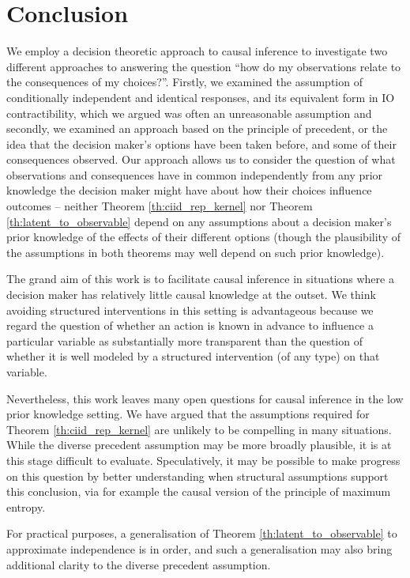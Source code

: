 \section{Conclusion}

We employ a decision theoretic approach to causal inference to investigate two different approaches to answering the question ``how do my observations relate to the consequences of my choices?''. Firstly, we examined the assumption of conditionally independent and identical responses, and its equivalent form in IO contractibility, which we argued was often an unreasonable assumption and secondly, we examined an approach based on the principle of precedent, or the idea that the decision maker's options have been taken before, and some of their consequences observed. Our approach allows us to consider the question of what observations and consequences have in common independently from any prior knowledge the decision maker might have about how their choices influence outcomes -- neither Theorem \ref{th:ciid_rep_kernel} nor Theorem \ref{th:latent_to_observable} depend on any assumptions about a decision maker's prior knowledge of the effects of their different options (though the plausibility of the assumptions in both theorems may well depend on such prior knowledge).

The grand aim of this work is to facilitate causal inference in situations where a decision maker has relatively little causal knowledge at the outset. We think avoiding structured interventions in this setting is advantageous because we regard the question of whether an action is known in advance to influence a particular variable as substantially more transparent than the question of whether it is well modeled by a structured intervention (of any type) on that variable.

Nevertheless, this work leaves many open questions for causal inference in the low prior knowledge setting. We have argued that the assumptions required for Theorem \ref{th:ciid_rep_kernel} are unlikely to be compelling in many situations. While the diverse precedent assumption may be more broadly plausible, it is at this stage difficult to evaluate. Speculatively, it may be possible to make progress on this question by better understanding when structural assumptions support this conclusion, via for example the causal version of the principle of maximum entropy.

For practical purposes, a generalisation of Theorem \ref{th:latent_to_observable} to approximate independence is in order, and such a generalisation may also bring additional clarity to the diverse precedent assumption.

